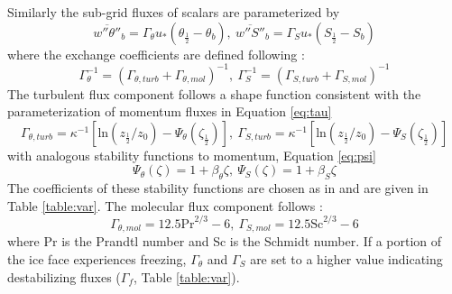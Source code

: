 \documentclass[draft]{agujournal2019}
\begin{document}
Similarly the sub-grid fluxes of scalars are parameterized by
\begin{equation} \label{eq:melt_flux}
    \overline{w''\theta''}_b = \Gamma_{\theta} u_* \left(\theta_{\frac{1}{2}} - \theta_b\right),\: 
    \overline{w''S''}_b = \Gamma_S u_* \left(S_{\frac{1}{2}} - S_b\right)
\end{equation}
%
where the exchange coefficients are defined following \cite{mcphee_dynamics_1987}:
\begin{equation} \label{eq:gamma}
    \Gamma_{\theta}^{-1} = \left(\Gamma_{\theta,turb} + \Gamma_{\theta,mol}\right)^{-1},\:
    \Gamma_S^{-1} = \left(\Gamma_{S,turb} + \Gamma_{S,mol}\right)^{-1}
\end{equation}
%
The turbulent flux component follows a shape function consistent with the parameterization of momentum fluxes in Equation \ref{eq:tau}
\begin{equation} \label{eq:gamma_turb}
    \Gamma_{\theta,turb} = \kappa^{-1} \left[\textrm{ln}\left(z_{\frac{1}{2}}/z_0\right) - \Psi_{\theta}\left(\zeta_{\frac{1}{2}}\right)\right], \:
    \Gamma_{S,turb} = \kappa^{-1} \left[\textrm{ln}\left(z_{\frac{1}{2}}/z_0\right) - \Psi_S\left(\zeta_{\frac{1}{2}}\right)\right]    %
\end{equation}
with analogous stability functions to momentum, Equation \ref{eq:psi}
\begin{equation}
    \Psi_{\theta}(\zeta) = 1 + \beta_{\theta}\zeta, \:
    \Psi_{S}(\zeta) = 1 + \beta_{S}\zeta
\end{equation}
The coefficients of these stability functions are chosen as in \cite{zhou_self-similar_2017} and are given in Table \ref{table:var}. The molecular flux component follows :
\begin{equation}
    \Gamma_{\theta,mol} = 12.5 \textrm{Pr}^{2/3} - 6, \:
    \Gamma_{S,mol} = 12.5 \textrm{Sc}^{2/3} - 6
\end{equation}
where Pr is the Prandtl number and Sc is the Schmidt number. If a portion of the ice face experiences freezing, $\Gamma_\theta$ and $\Gamma_S$ are set to a higher value indicating destabilizing fluxes ($\Gamma_{f}$, Table \ref{table:var}).
\end{document}
